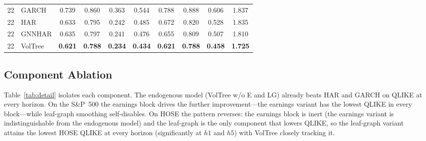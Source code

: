 \documentclass[runningheads,a4paper]{llncs}
\begin{document}
\begin{table}[!t]
\begin{tabular}{ll cccc cccc}
\midrule
22 & GARCH    & 0.739 & 0.860 & 0.363 & 0.544 & 0.788 & 0.888 & 0.606 & 1.837 \\
22 & HAR      & 0.633 & 0.795 & 0.242 & 0.485 & 0.672 & 0.820 & 0.528 & 1.835 \\
22 & GNNHAR   & 0.635 & 0.797 & 0.241 & 0.476 & 0.655 & 0.809 & 0.507 & 1.810 \\
22 & VolTree & \textbf{0.621} & \textbf{0.788} & \textbf{0.234} & \textbf{0.434} & \textbf{0.621} & \textbf{0.788} & \textbf{0.458} & \textbf{1.725} \\
\bottomrule
\end{tabular}
\end{table}

\subsection{Component Ablation}
Table~\ref{tab:detail} isolates each component. The endogenous model (VolTree w/o E and LG) already beats HAR and
GARCH on QLIKE at every horizon. On the S\&P~500 the earnings block drives the further improvement---the
earnings variant has the lowest QLIKE in every block---while leaf-graph smoothing self-disables. On HOSE the pattern
reverses: the earnings block is inert (the earnings variant is indistinguishable from the endogenous model) and the leaf-graph is the only
component that lowers QLIKE, so the leaf-graph variant attains the lowest HOSE QLIKE at every horizon (significantly at $h1$
and $h5$) with VolTree closely tracking it.
\end{document}

